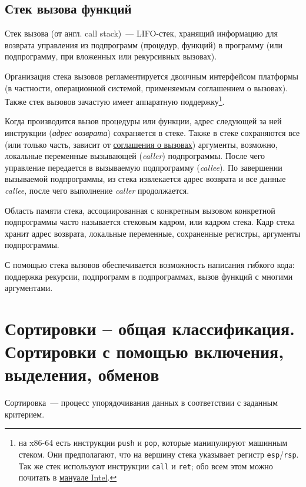 \subsection{Стек вызова функций}
Стек вызова (от англ. call stack)~--- LIFO-стек, хранящий информацию для возврата
управления из подпрограмм (процедур, функций) в программу
(или подпрограмму, при вложенных или рекурсивных вызовах).

Организация стека вызовов регламентируется двоичным интерфейсом платформы (в частности, операционной системой,
применяемым соглашением о вызовах). Также стек вызовов зачастую имеет аппаратную поддержку\footnote{на x86-64 есть инструкции \texttt{push} и \texttt{pop}, которые
  манипулируют машинным стеком. Они предполагают, что на вершину стека указывает регистр \texttt{esp}/\texttt{rsp}. Так же стек используют
  инструкции \texttt{call} и \texttt{ret}; обо всем этом можно почитать в \href{https://www.cs.cmu.edu/~410/doc/intel-isr.pdf}{мануале Intel}.
}.

Когда производится вызов процедуры или функции, адрес следующей за ней инструкции (\textit{адрес возврата}) сохраняется в стеке. Также в
стеке сохраняются все (или только часть, зависит от \href{https://en.wikipedia.org/wiki/Calling_convention}{соглашения о вызовах})
аргументы, возможно, локальные переменные вызывающей (\textit{caller}) подпрограммы. После чего управление передается в вызываемую
подпрограмму (\textit{callee}). По завершении вызываемой подпрограммы, из стека извлекается адрес возврата и все данные \textit{callee},
после чего выполнение \textit{caller} продолжается.

Область памяти стека, ассоциированная с конкретным вызовом конкретной подпрограммы часто называется стековым кадром, или кадром стека.
Кадр стека хранит адрес возврата, локальные переменные, сохраненные регистры, аргументы подпрограммы.

С помощью стека вызовов обеспечивается возможность написания гибкого кода: поддержка рекурсии, подпрограмм в подпрограммах, вызов функций
с многими аргументами.

%
%

\section{Сортировки – общая классификация. Сортировки с помощью включения, выделения, обменов}
Сортировка~--- процесс упорядочивания данных в соответствии с заданным критерием.

